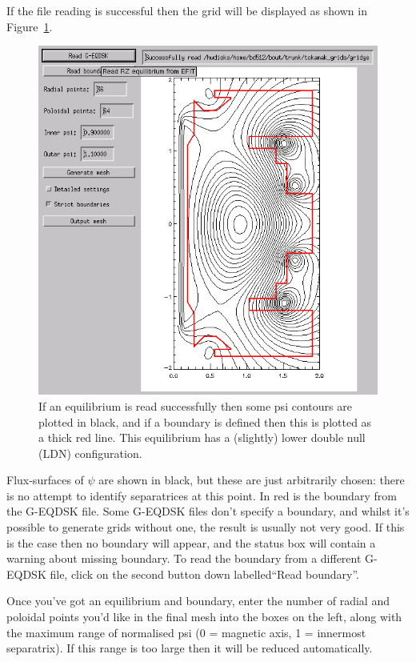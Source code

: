 \documentclass[12pt, a4paper]{article}
\begin{document}
If the file reading is successful then the grid will be displayed as shown
in Figure~\ref{fig:screen_2}.
\begin{figure}[h!]
  \centering
  \includegraphics[width=0.5\paperwidth, keepaspectratio]{screen_2.png}
  \caption{If an equilibrium is read successfully then some psi contours
    are plotted in black, and if a boundary is defined then this is plotted
    as a thick red line. This equilibrium has a (slightly) lower double null
(LDN) configuration.}
  \label{fig:screen_2}
\end{figure}
Flux-surfaces of $\psi$ are shown in black, but these are just arbitrarily
chosen: there is no attempt to identify separatrices at this point. In red
is the boundary from the G-EQDSK file. Some G-EQDSK files don't specify
a boundary, and whilst it's possible to generate grids without one, the
result is usually not very good. If this is the case then no boundary will
appear, and the status box will contain a warning about missing boundary.
To read the boundary from a different
G-EQDSK file, click on the second button down labelled``Read boundary''.

Once you've got an equilibrium and boundary, enter the number of radial and
poloidal points you'd like in the final mesh into the boxes on the left, along
with the maximum range of normalised psi (0 = magnetic axis, 1 = innermost
separatrix). If this range is too large then it will be reduced automatically.
\end{document}
